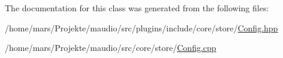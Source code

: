 The documentation for this class was generated from the following files\-:\begin{DoxyCompactItemize}
\item 
/home/mars/\-Projekte/maudio/src/plugins/include/core/store/\hyperlink{Config_8hpp}{Config.\-hpp}\item 
/home/mars/\-Projekte/maudio/src/core/store/\hyperlink{core_2store_2Config_8cpp}{Config.\-cpp}\end{DoxyCompactItemize}
